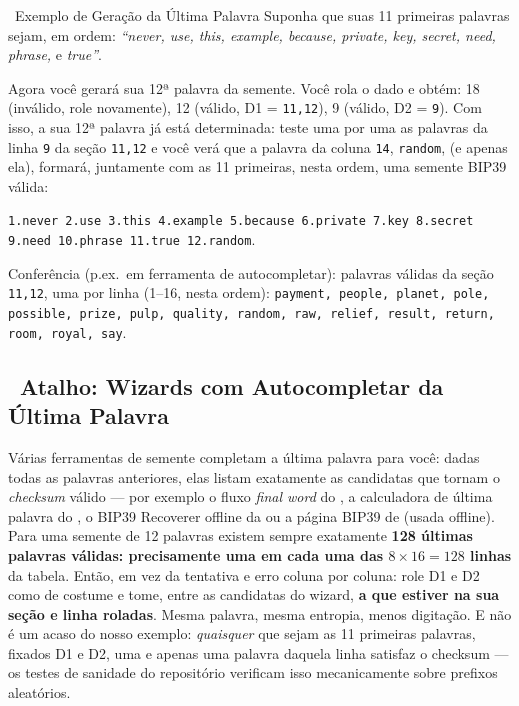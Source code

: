 \documentclass[10pt]{article}
\begin{document}
\begin{examplebox}{\faLightbulb~Exemplo de Geração da Última Palavra}
Suponha que suas 11 primeiras palavras sejam, em ordem: \textit{``never, use, this, example, because, private, key, secret, need, phrase,} e \textit{true''}.

Agora você gerará sua 12ª palavra da semente. Você rola o dado e obtém: 18 (inválido, role novamente), 12 (válido, D1 = \texttt{11,12}), 9 (válido, D2 = \texttt{9}). Com isso, a sua 12ª palavra já está determinada: teste uma por uma as palavras da linha \texttt{9} da seção \texttt{11,12} e você verá que a palavra da coluna \texttt{14}, \texttt{random}, (e apenas ela), formará, juntamente com as 11 primeiras, nesta ordem, uma semente BIP39 válida:

\vspace{0.5em}
\texttt{1.never 2.use 3.this 4.example 5.because 6.private 7.key 8.secret 9.need 10.phrase 11.true 12.random}. \faCheckCircle
\vspace{0.25em}

{\scriptsize Conferência (p.ex.\ em ferramenta de autocompletar): palavras válidas da seção \texttt{11,12}, uma por linha (1--16, nesta ordem): \texttt{payment, people, planet, pole, possible, prize, pulp, quality, random, raw, relief, result, return, room, royal, say}.\par}
\end{examplebox}

\subsection*{\faMagic~Atalho: Wizards com Autocompletar da Última Palavra}

Várias ferramentas de semente completam a última palavra para você: dadas todas as palavras anteriores, elas listam exatamente as candidatas que tornam o \textit{checksum} válido --- por exemplo o fluxo \textit{final word} do \seedsignerlink{}, a calculadora de última palavra do \seedpickerlink{}, o BIP39 Recoverer offline da \coinplatelink{} ou a página BIP39 de \iancolemanlink{} (usada offline). Para uma semente de 12 palavras existem sempre exatamente \textbf{128 últimas palavras válidas: precisamente uma em cada uma das $8\times16=128$ linhas} da tabela. Então, em vez da tentativa e erro coluna por coluna: role D1 e D2 como de costume e tome, entre as candidatas do wizard, \textbf{a que estiver na sua seção e linha roladas}. Mesma palavra, mesma entropia, menos digitação. E não é um acaso do nosso exemplo: \emph{quaisquer} que sejam as 11 primeiras palavras, fixados D1 e D2, uma e apenas uma palavra daquela linha satisfaz o checksum --- os testes de sanidade do repositório verificam isso mecanicamente sobre prefixos aleatórios.
\end{document}
